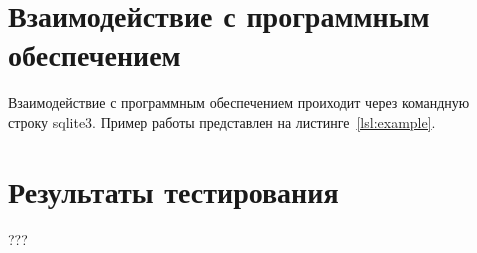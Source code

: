 {
\captionsetup{format=hang,justification=raggedright,
              singlelinecheck=off,width=16cm}
}

\section{Взаимодействие с программным обеспечением}

Взаимодействие с программным обеспечением проиходит через командную строку
sqlite3. Пример работы представлен на листинге~\ref{lsl:example}.

\section{Результаты тестирования}

???
